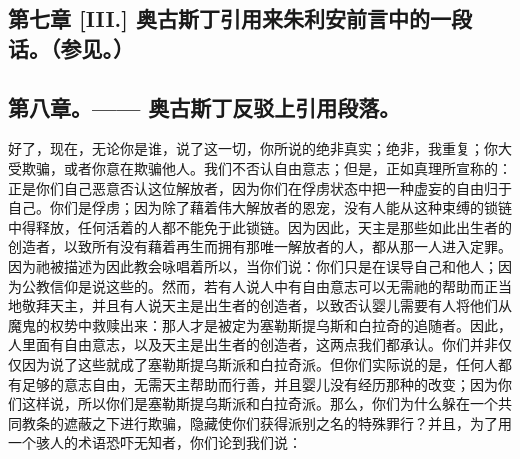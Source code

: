 
\subsection{第七章 [III.] 奥古斯丁引用来朱利安前言中的一段话。（参见。）}

\par


\subsection{第八章。—— 奥古斯丁反驳上引用段落。}

好了，现在，无论你是谁，说了这一切，你所说的绝非真实；绝非，我重复；你大受欺骗，或者你意在欺骗他人。我们不否认自由意志；但是，正如真理所宣称的：正是你们自己恶意否认这位解放者，因为你们在俘虏状态中把一种虚妄的自由归于自己。你们是俘虏；因为除了藉着伟大解放者的恩宠，没有人能从这种束缚的锁链中得释放，任何活着的人都不能免于此锁链。因为因此，天主是那些如此出生者的创造者，以致所有没有藉着再生而拥有那唯一解放者的人，都从那一人进入定罪。因为祂被描述为因此教会咏唱着所以，当你们说：你们只是在误导自己和他人；因为公教信仰是说这些的。然而，若有人说人中有自由意志可以无需祂的帮助而正当地敬拜天主，并且有人说天主是出生者的创造者，以致否认婴儿需要有人将他们从魔鬼的权势中救赎出来：那人才是被定为塞勒斯提乌斯和白拉奇的追随者。因此，人里面有自由意志，以及天主是出生者的创造者，这两点我们都承认。你们并非仅仅因为说了这些就成了塞勒斯提乌斯派和白拉奇派。但你们实际说的是，任何人都有足够的意志自由，无需天主帮助而行善，并且婴儿没有经历那种的改变；因为你们这样说，所以你们是塞勒斯提乌斯派和白拉奇派。那么，你们为什么躲在一个共同教条的遮蔽之下进行欺骗，隐藏使你们获得派别之名的特殊罪行？并且，为了用一个骇人的术语恐吓无知者，你们论到我们说：\par

